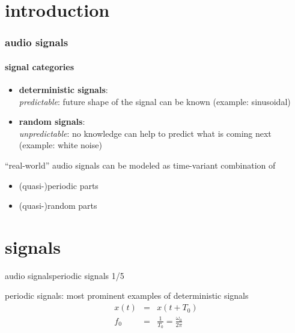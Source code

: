     \section[intro]{introduction}
        \begin{frame}\frametitle{audio signals}\framesubtitle{signal categories}
            \begin{itemize}
                \item	\textbf{deterministic signals}:\\
                        \textit{predictable}: future shape of the signal can be known (example: sinusoidal)
                \pause		
                \item	\textbf{random signals}:\\
                        \textit{unpredictable}: no knowledge can help to predict what is coming next (example: white noise)
            \end{itemize}
            
            \bigskip
            \pause
            ``real-world'' audio signals can be modeled as time-variant combination of 
            \begin{itemize}
                \item	(quasi-)periodic parts
                \item	(quasi-)random parts
            \end{itemize}
        \end{frame}

    \section[signals]{signals}
        \begin{frame}{audio signals}{periodic signals 1/5}

            periodic signals: most prominent examples of deterministic signals
            \begin{eqnarray*}
                x(t) 	&=& x(t+T_0)\\
                f_0 	&=& \frac{1}{T_0} =  \frac{\omega_0}{2\pi}
            \end{eqnarray*}

        \end{frame}

